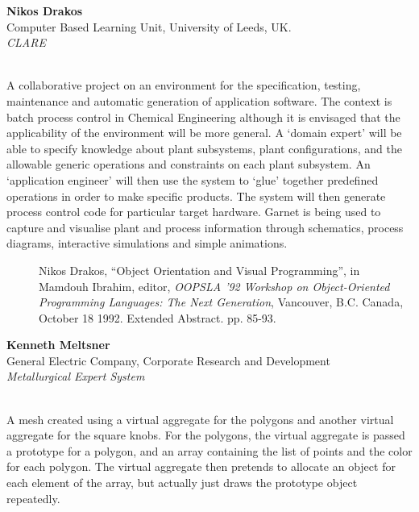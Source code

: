 \newpage{}
\begin{center}
\end{center}
\begin{center}
\end{center}
\begin{tabular}
{\bf Nikos Drakos}\\
Computer Based Learning Unit, University of Leeds, UK.\\
{\it CLARE}\\
\\
\end{tabular}

A collaborative project on an environment for the specification, testing,
maintenance and automatic generation of application software.
The context is batch process control in Chemical Engineering although
it is envisaged that the applicability of the environment will be more general.
A `domain expert' will be able to specify knowledge about plant
subsystems, plant configurations, and the allowable generic operations and
constraints on each plant subsystem. An `application engineer' will then use
the system to `glue' together predefined operations in order to make specific
products. The system will then generate process control code for particular
target hardware. Garnet is being used to capture and visualise plant and
process information through schematics, process diagrams, interactive
simulations and simple animations.
\begin{description}
\item[] Nikos Drakos, ``Object Orientation and Visual Programming'', in
Mamdouh Ibrahim, editor, {\it OOPSLA '92 Workshop on Object-Oriented
Programming Languages: The Next Generation}, Vancouver, B.C.
Canada, October 18 1992. Extended Abstract. pp. 85-93.
\end{description}



\newpage{}

\begin{center}
\end{center}
\begin{tabular}
{\bf Kenneth Meltsner}\\
General Electric Company, Corporate Research and Development\\
{\it Metallurgical Expert System}\\
\\
\end{tabular}
A mesh created using a virtual aggregate for the
polygons and another virtual aggregate for the square knobs.  For the
polygons, the virtual aggregate is passed a prototype for a
polygon, and an array containing the list of points and the color for
each polygon.   The virtual aggregate then pretends to
allocate an object for each element of the array, but actually just
draws the prototype object repeatedly.

